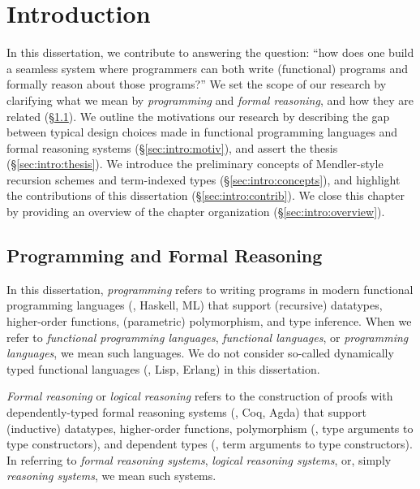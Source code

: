 \chapter{Introduction}\label{ch:intro}

In this dissertation, we contribute to answering the question:
``how does one build a seamless system where programmers can both
write (functional) programs and formally reason about those programs?''
We set the scope of our research by clarifying what we mean by
\emph{programming} and \emph{formal reasoning}, and
how they are related (\S\ref{sec:intro:scope}).
We outline the motivations our research by describing the gap between
typical design choices made in functional programming languages
and formal reasoning systems (\S\ref{sec:intro:motiv}),
and assert the thesis (\S\ref{sec:intro:thesis}).
We introduce the preliminary concepts of Mendler-style recursion schemes
and term-indexed types (\S\ref{sec:intro:concepts}), and highlight
the contributions of this dissertation (\S\ref{sec:intro:contrib}).
We close this chapter by providing an overview of
the chapter organization (\S\ref{sec:intro:overview}).

\section{Programming and Formal Reasoning}\label{sec:intro:scope}

In this dissertation, \emph{programming} refers to writing programs in
modern functional programming languages (\eg, Haskell, ML) that support
(recursive) datatypes, higher-order functions, (parametric) polymorphism,
and type inference. When we refer to \emph{functional programming languages},
\emph{functional languages}, or \emph{programming languages},
we mean such languages. We do not consider so-called dynamically typed
functional languages (\eg, Lisp, Erlang) in this dissertation.

\emph{Formal reasoning} or \emph{logical reasoning} refers to the construction
of proofs with dependently-typed formal reasoning systems
(\eg, Coq, Agda) that support (inductive) datatypes, higher-order functions,
polymorphism (\ie, type arguments to type constructors), and
dependent types (\ie, term arguments to type constructors). In referring to
\emph{formal reasoning systems}, \emph{logical reasoning systems},
or, simply \emph{reasoning systems}, we mean such systems.

